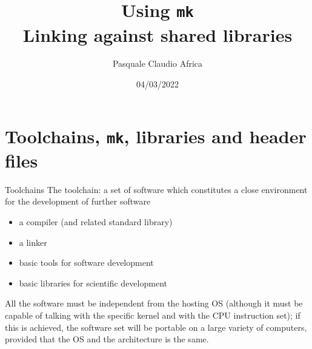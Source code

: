 \documentclass[10pt]{beamer}
\begin{document}
\title{Using \texttt{mk}\\
  Linking against shared libraries}
\author{Pasquale Claudio Africa}
\date{04/03/2022}

\begin{frame}
  \maketitle
\end{frame}

\section{Toolchains, \texttt{mk}, libraries and header files}

\begin{frame}{Toolchains}
  The toolchain: a set of software which constitutes a close environment for the development of further software

  \begin{itemize}
  \item a compiler (and related standard library)
  \item a linker
  \item basic tools for software development
  \item basic libraries for scientific development
  \end{itemize}	

  All the software must be independent from the hosting OS 
  (although it must be capable of talking with the specific kernel and with the CPU instruction set); if this is achieved, the software set will be portable on a large variety of computers, provided that the OS and the architecture is the same.

\end{frame}
\end{document}
